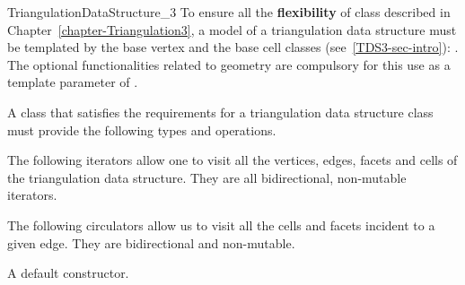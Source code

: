 \begin{ccRefConcept}{TriangulationDataStructure_3}
To ensure all the \textbf{flexibility} of class 
described in 
 Chapter~\ref{chapter-Triangulation3}, a model of a
triangulation data structure must be templated by the base vertex and
the base cell classes (see~\ref{TDS3-sec-intro}):
.
The optional functionalities related to geometry are compulsory for
this use as a template parameter of .

\bigskip

A class that satisfies the requirements for a
triangulation data structure class must provide the following types and
operations. 

\ccTypes
{}
\ccThreeToTwo

\ccGlue
{}

\ccGlue
{} 


The following iterators allow one to visit all the vertices, edges, facets
and cells of the triangulation data structure. They are all
bidirectional, non-mutable iterators.

\ccGlue
{}
\ccGlue
{}
\ccGlue
{}

The following circulators allow us to visit all the cells and facets
incident to a given edge. They are bidirectional and non-mutable.

\ccGlue
{}

\ccCreation
{}  %

{A default constructor.}


\end{ccRefConcept}
